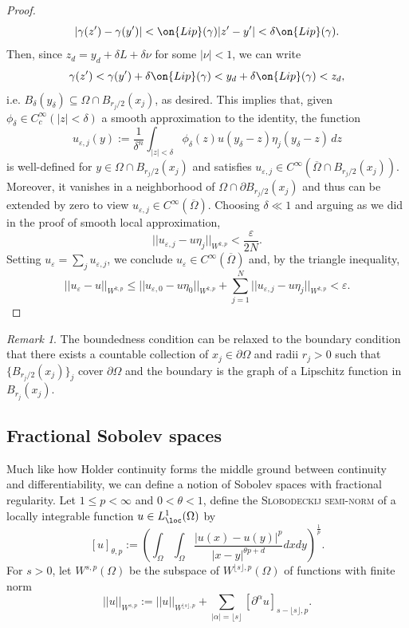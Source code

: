 \documentclass[reqno]{amsart}
\theoremstyle{definition}
\theoremstyle{remark}
\newtheorem*{remark}{Remark}
\renewcommand{\epsilon}{\varepsilon}
\renewcommand{\emph}{\textsc}
\begin{document}
\begin{proof}
		\[ |\gamma(z') - \gamma(y')| < \on{Lip} (\gamma) |z' - y'| < \delta \on{Lip} (\gamma).  \]
	Then, since $z_d = y_d + \delta L +\delta \nu$ for some $|\nu| < 1$, we can write
		\[ \gamma(z') < \gamma(y') +\delta \on{Lip} (\gamma) < y_d +\delta \on{Lip} (\gamma) < z_d, \]
	i.e. $B_\delta (y_\delta) \subseteq \Omega \cap B_{r_j/2} (x_j)$, as desired. This implies that, given  $\phi_\delta \in C^\infty_c (|z| <\delta)$ a smooth approximation to the identity, the function
		\[ u_{\epsilon, j} (y) := \frac{1}{\delta^n} \int_{|z| < \delta} \phi_\delta (z) u  (y_\delta - z) \eta_j (y_\delta - z) \, dz\]
	is well-defined for $y \in \Omega \cap B_{r_j/2} (x_j)$ and satisfies $u_{\epsilon, j} \in C^\infty (\overline \Omega \cap B_{r_j/2} (x_j))$. Moreover, it vanishes in a neighborhood of $\Omega \cap \partial B_{r_j/2} (x_j)$ and thus can be extended by zero to view $u_{\epsilon, j} \in C^\infty (\overline \Omega)$. Choosing $\delta \ll 1$ and arguing as we did in the proof of smooth local approximation, 
		\[ || u_{\epsilon, j} - u \eta_j ||_{W^{k, p}} < \frac{\epsilon}{2N}. \]
	Setting $u_\epsilon = \sum_j u_{\epsilon, j}$, we conclude $u_\epsilon \in C^\infty (\overline \Omega)$ and, by the triangle inequality, 
		\[ ||u_\epsilon - u||_{W^{k, p}} \leq ||u_{\epsilon, 0} - u \eta_0||_{W^{k, p}} + \sum_{j  = 1}^N ||u_{\epsilon, j} - u \eta_j||_{W^{k, p}} < \epsilon . \]
\end{proof}

\begin{remark}
	The boundedness condition can be relaxed to the boundary condition that there exists a countable collection of $x_j \in \partial \Omega$ and radii $r_j > 0$ such that $\{ B_{r_j/2}(x_j) \}_j$ cover $\partial \Omega$ and the boundary is the graph of a Lipschitz function in $B_{r_j} (x_j)$. 
\end{remark}

\subsection{Fractional Sobolev spaces}

Much like how Holder continuity forms the middle ground between continuity and differentiability, we can define a notion of Sobolev spaces with fractional regularity. Let $1 \leq p < \infty$ and $0 < \theta < 1$, define the \emph{Slobodeckij semi-norm} of a locally integrable function $u \in L^1_\loc (\Omega)$ by 
	\[ [u]_{\theta, p} := \left( \int_\Omega \int_\Omega \frac{|u(x) - u(y)|^p}{|x - y|^{\theta p + d}} dx dy \right)^{\frac1p}. \]
For $s > 0$, let $W^{s, p} (\Omega)$ be the subspace of $W^{\lfloor s \rfloor, p} (\Omega)$ of functions with finite norm
	\[ ||u||_{W^{s, p}} := || u ||_{W^{\lfloor s \rfloor, p}} + \sum_{|\alpha| = \lfloor s \rfloor} [\partial^\alpha u]_{s - \lfloor s \rfloor, p}.  \]
\end{document}
